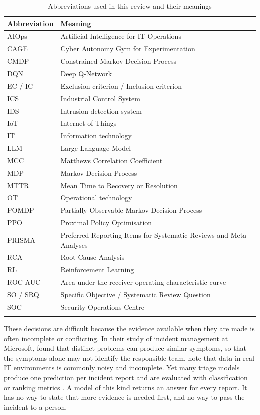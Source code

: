 \documentclass[pdflatex,sn-basic]{sn-jnl}
\begin{document}
\begin{table}[!htbp]
\caption{Abbreviations used in this review and their meanings}\label{tab:abbrev}
\footnotesize
\begin{tabularx}{\textwidth}{@{}lL@{}}
\toprule
Abbreviation & Meaning \\
\midrule
AIOps & Artificial Intelligence for IT Operations \\
CAGE & Cyber Autonomy Gym for Experimentation \\
CMDP & Constrained Markov Decision Process \\
DQN & Deep Q-Network \\
EC / IC & Exclusion criterion / Inclusion criterion \\
ICS & Industrial Control System \\
IDS & Intrusion detection system \\
IoT & Internet of Things \\
IT & Information technology \\
LLM & Large Language Model \\
MCC & Matthews Correlation Coefficient \\
MDP & Markov Decision Process \\
MTTR & Mean Time to Recovery or Resolution \\
OT & Operational technology \\
POMDP & Partially Observable Markov Decision Process \\
PPO & Proximal Policy Optimisation \\
PRISMA & Preferred Reporting Items for Systematic Reviews and Meta-Analyses \\
RCA & Root Cause Analysis \\
RL & Reinforcement Learning \\
ROC-AUC & Area under the receiver operating characteristic curve \\
SO / SRQ & Specific Objective / Systematic Review Question \\
SOC & Security Operations Centre \\
\botrule
\end{tabularx}
\end{table}

These decisions are difficult because the evidence available when they are made is often incomplete or conflicting. In their study of incident management at Microsoft, \citet{chen2020} found that distinct problems can produce similar symptoms, so that the symptoms alone may not identify the responsible team. \citet{remil2024} note that data in real IT environments is commonly noisy and incomplete. Yet many triage models produce one prediction per incident report and are evaluated with classification or ranking metrics \citep{remil2024}. A model of this kind returns an answer for every report. It has no way to state that more evidence is needed first, and no way to pass the incident to a person.
\end{document}
